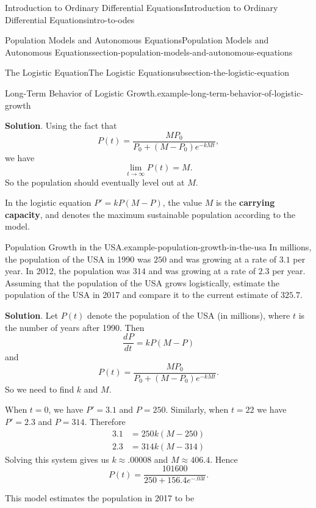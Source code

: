 \documentclass[oneside,10pt,]{book}
\newcommand{\terminology}[1]{\textbf{#1}}
\numberwithin{equation}{section}
\newcommand{\dv}[3][]{\dfrac{d^{#1} #2}{d #3^{#1}}}
\begin{document}
\begin{chapterptx}{Introduction to Ordinary Differential Equations}{}{Introduction to Ordinary Differential Equations}{}{}{intro-to-odes}
\begin{sectionptx}{Population Models and Autonomous Equations}{}{Population Models and Autonomous Equations}{}{}{section-population-models-and-autonomous-equations}
\begin{subsectionptx}{The Logistic Equation}{}{The Logistic Equation}{}{}{subsection-the-logistic-equation}
\begin{example}{Long-Term Behavior of Logistic Growth.}{example-long-term-behavior-of-logistic-growth}
\par\smallskip%
\noindent\textbf{Solution}.\hypertarget{solution-18}{}\quad%
\hypertarget{p-114}{}%
Using the fact that%
\begin{equation*}
P(t) = \frac{MP_{0}}{P_{0} + (M - P_{0})e^{-kMt}},
\end{equation*}
we have%
\begin{equation*}
\lim_{t\to\infty}P(t) = M.
\end{equation*}
So the population should eventually level out at \(M\).%
\end{example}
\hypertarget{p-115}{}%
In the logistic equation \(P' = kP(M-P)\), the value \(M\) is the \terminology{carrying capacity}, and denotes the maximum sustainable population according to the model.%
\begin{example}{Population Growth in the USA.}{example-population-growth-in-the-usa}%
\hypertarget{p-116}{}%
In millions, the population of the USA in 1990 was \(250\) and was growing at a rate of \(3.1\) per year. In 2012, the population was \(314\) and was growing at a rate of \(2.3\) per year. Assuming that the population of the USA grows logistically, estimate the population of the USA in 2017 and compare it to the current estimate of \(325.7\).%
\par\smallskip%
\noindent\textbf{Solution}.\hypertarget{solution-19}{}\quad%
\hypertarget{p-117}{}%
Let \(P(t)\) denote the population of the USA (in millions), where \(t\) is the number of years after 1990. Then%
\begin{equation*}
\dv{P}{t} = kP(M-P)
\end{equation*}
and%
\begin{equation*}
P(t) = \frac{MP_{0}}{P_{0} + (M - P_{0})e^{-kMt}}.
\end{equation*}
So we need to find \(k\) and \(M\).%
\par
\hypertarget{p-118}{}%
When \(t = 0\), we have \(P' = 3.1\) and \(P = 250\). Similarly, when \(t = 22\) we have \(P' = 2.3\) and \(P = 314\). Therefore%
\begin{align*}
3.1 & = 250k(M - 250) \\
2.3 & = 314k(M - 314) 
\end{align*}
Solving this system gives us \(k\approx.00008\) and \(M \approx 406.4\). Hence%
\begin{equation*}
P(t) = \frac{101600}{250 + 156.4e^{-.03t}}.
\end{equation*}
%
\par
\hypertarget{p-119}{}%
This model estimates the population in 2017 to be%

\end{example}
\end{subsectionptx}
\end{sectionptx}
\end{chapterptx}
\end{document}
